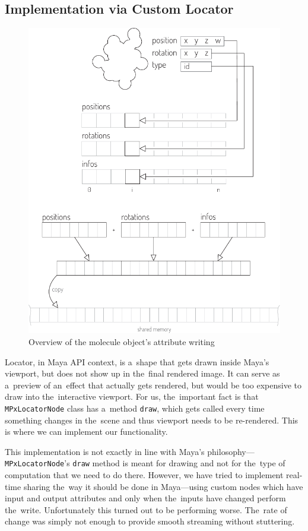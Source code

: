 \documentclass[
  digital, %
  table,   %
  nolof,     %
  nolot,     %
  oneside,
]{fithesis3}
\begin{document}
\subsection{Implementation via Custom Locator}
\begin{figure}
  \centering
  \includegraphics[scale=1.0]{images/attr-writing-high-layout.pdf}
  \caption{Overview of the molecule object's attribute writing}
  \label{fig:attribute-writing}
\end{figure}

Locator, in Maya API context, is a shape that gets drawn inside Maya's viewport, but does not show up in the final rendered image. It can serve as a preview of an effect that actually gets rendered, but would be too expensive to draw into the interactive viewport. For us, the important fact is that \texttt{MPxLocatorNode} class has a method \texttt{draw}, which gets called every time something changes in the scene and thus viewport needs to be re-rendered. This is where we can implement our functionality.

This implementation is not exactly in line with Maya's philosophy—\texttt{MPxLocatorNode}'s \texttt{draw} method is meant for drawing and not for the type of computation that we need to do there. However, we have tried to implement real-time sharing the way it should be done in Maya—using custom nodes which have input and output attributes and only when the inputs have changed perform the write. Unfortunately this turned out to be performing worse. The rate of change was simply not enough to provide smooth streaming without stuttering.
\end{document}
